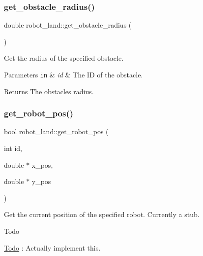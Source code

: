 \subsubsection{\texorpdfstring{get\+\_\+obstacle\+\_\+radius()}{get\_obstacle\_radius()}}
{\footnotesize\ttfamily double robot\+\_\+land\+::get\+\_\+obstacle\+\_\+radius (\begin{DoxyParamCaption}{ }\end{DoxyParamCaption})}



Get the radius of the specified obstacle. 


\begin{DoxyParams}[1]{Parameters}
\mbox{\tt in}  & {\em id} & The ID of the obstacle.\\
\hline
\end{DoxyParams}
\begin{DoxyReturn}{Returns}
The obstacle\textquotesingle{}s radius. 
\end{DoxyReturn}
\mbox{\label{classrobot__land_a600cee26e615092e6425e5f1f8544d8b}} 
\subsubsection{\texorpdfstring{get\+\_\+robot\+\_\+pos()}{get\_robot\_pos()}}
{\footnotesize\ttfamily bool robot\+\_\+land\+::get\+\_\+robot\+\_\+pos (\begin{DoxyParamCaption}\item[{int}]{id,  }\item[{double $\ast$}]{x\+\_\+pos,  }\item[{double $\ast$}]{y\+\_\+pos }\end{DoxyParamCaption})}



Get the current position of the specified robot. Currently a stub. 

\begin{DoxyRefDesc}{Todo}
\item[\hyperlink{todo__todo000001}{Todo}]\+: Actually implement this.\end{DoxyRefDesc}



